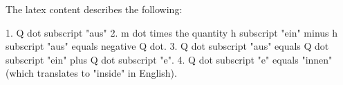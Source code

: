 The latex content describes the following:

1. Q dot subscript "aus"
2. m dot times the quantity h subscript "ein" minus h subscript "aus" equals negative Q dot.
3. Q dot subscript "aus" equals Q dot subscript "ein" plus Q dot subscript "e".
4. Q dot subscript "e" equals "innen" (which translates to "inside" in English).